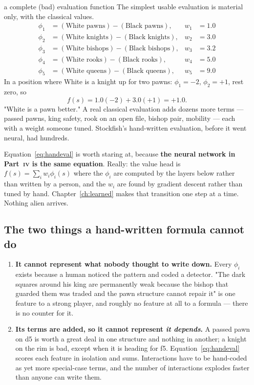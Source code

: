 \begin{worked}{a complete (bad) evaluation function}
The simplest usable evaluation is material only, with the classical values.
\[
\begin{aligned}
\phi_1 &= (\text{White pawns}) - (\text{Black pawns}),   & w_1 &= 1.0\\
\phi_2 &= (\text{White knights}) - (\text{Black knights}),& w_2 &= 3.0\\
\phi_3 &= (\text{White bishops}) - (\text{Black bishops}),& w_3 &= 3.2\\
\phi_4 &= (\text{White rooks}) - (\text{Black rooks}),   & w_4 &= 5.0\\
\phi_5 &= (\text{White queens}) - (\text{Black queens}), & w_5 &= 9.0
\end{aligned}
\]
In a position where White is a knight up for two pawns:
$\phi_1 = -2$, $\phi_2 = +1$, rest zero, so
\[
f(s) = 1.0(-2) + 3.0(+1) = +1.0 .
\]
"White is a pawn better." A real classical evaluation adds dozens more terms --- passed
pawns, king safety, rook on an open file, bishop pair, mobility --- each with a weight
someone tuned. Stockfish's hand-written evaluation, before it went neural, had hundreds.
\end{worked}

Equation~\eqref{eq:handeval} is worth staring at, because \textbf{the neural network in
Part~\textsc{iv} is the same equation}. Really: the value head is $f(s) = \sum_i w_i
\phi_i(s)$ where the $\phi_i$ are computed by the layers below rather than written by a
person, and the $w_i$ are found by gradient descent rather than tuned by hand.
Chapter~\ref{ch:learned} makes that transition one step at a time. Nothing alien arrives.

\subsection{The two things a hand-written formula cannot do}

\begin{enumerate}
\item \textbf{It cannot represent what nobody thought to write down.} Every $\phi_i$ exists
  because a human noticed the pattern and coded a detector. "The dark squares around his
  king are permanently weak because the bishop that guarded them was traded and the pawn
  structure cannot repair it" is one feature to a strong player, and roughly no feature at
  all to a formula --- there is no counter for it.
\item \textbf{Its terms are added, so it cannot represent \emph{it depends}.} A passed pawn
  on d5 is worth a great deal in one structure and nothing in another; a knight on the rim
  is bad, except when it is heading for f5. Equation~\eqref{eq:handeval} scores each feature
  in isolation and sums. Interactions have to be hand-coded as yet more special-case terms,
  and the number of interactions explodes faster than anyone can write them.
\end{enumerate}

